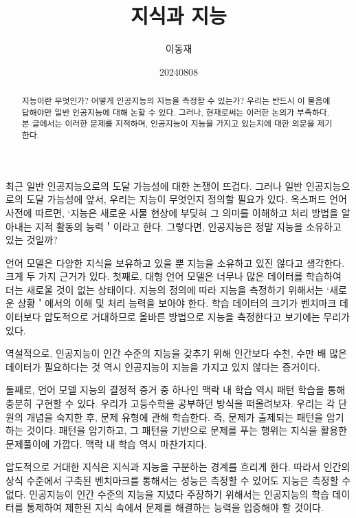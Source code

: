 \documentclass[11pt, oneside]{article}   	%
\title{지식과 지능}
\author{이동재}
\date{20240808}
\begin{document}
\maketitle


\begin{abstract}
  지능이란 무엇인가? 어떻게 인공지능의 지능을 측정할 수 있는가? 우리는 반드시 이 물음에 답해야만 일반 인공지능에 대해 논할 수 있다. 그러나, 현재로써는 이러한 논의가 부족하다. 본 글에서는 이러한 문제를 지적하며, 인공지능이 지능을 가지고 있는지에 대한 의문을 제기한다.
\end{abstract}
최근 일반 인공지능으로의 도달 가능성에 대한 논쟁이 뜨겁다. 그러나 일반 인공지능으로의 도달 가능성에 앞서, 우리는 지능이 무엇인지 정의할 필요가 있다. 옥스퍼드 언어 사전에 따르면, `지능은 새로운 사물 현상에 부딪혀 그 의미를 이해하고 처리 방법을 알아내는 지적 활동의 능력＇이라고 한다. 그렇다면, 인공지능은 정말 지능을 소유하고 있는 것일까?

언어 모델은 다양한 지식을 보유하고 있을 뿐 지능을 소유하고 있진 않다고 생각한다. 크게 두 가지 근거가 있다. 첫째로, 대형 언어 모델은 너무나 많은 데이터를 학습하여 더는 새로울 것이 없는 상태이다.
지능의 정의에 따라 지능을 측정하기 위해서는 `새로운 상황＇에서의 이해 및 처리 능력을 보아야 한다. 학습 데이터의 크기가 벤치마크 데이터보다 압도적으로 거대하므로 올바른 방법으로 지능을 측정한다고 보기에는 무리가 있다.

역설적으로, 인공지능이 인간 수준의 지능을 갖추기 위해 인간보다 수천, 수만 배 많은 데이터가 필요하다는 것 역시 인공지능이 지능을 가지고 있지 않다는 증거이다.

둘째로, 언어 모델 지능의 결정적 증거 중 하나인 맥락 내 학습 역시 패턴 학습을 통해 충분히 구현할 수 있다. 우리가 고등수학을 공부하던 방식을 떠올려보자. 우리는 각 단원의 개념을 숙지한 후, 문제 유형에 관해 학습한다. 즉, 문제가 출제되는 패턴을 암기하는 것이다.
패턴을 암기하고, 그 패턴을 기반으로 문제를 푸는 행위는 지식을 활용한 문제풀이에 가깝다. 맥락 내 학습 역시 마찬가지다.

압도적으로 거대한 지식은 지식과 지능을 구분하는 경계를 흐리게 한다. 따라서 인간의 상식 수준에서 구축된 벤치마크를 통해서는 성능은 측정할 수 있어도 지능은 측정할 수 없다.
인공지능이 인간 수준의 지능을 지녔다 주장하기 위해서는 인공지능의 학습 데이터를 통제하여 제한된 지식 속에서 문제를 해결하는 능력을 입증해야 할 것이다.
\end{document}
